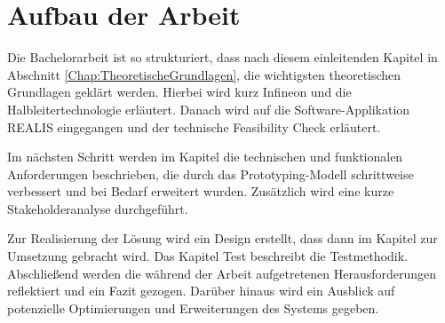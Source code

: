 \section{Aufbau der Arbeit}
Die Bachelorarbeit ist so strukturiert, dass nach diesem einleitenden Kapitel in Abschnitt \ref{Chap:TheoretischeGrundlagen}, die wichtigsten theoretischen Grundlagen geklärt werden. 
Hierbei wird kurz Infineon und die Halbleitertechnologie erläutert. Danach wird auf die Software-Applikation \gls{REALIS} eingegangen und der technische Feasibility Check erläutert.

Im nächsten Schritt werden im Kapitel  die technischen und funktionalen Anforderungen beschrieben, die durch das Prototyping-Modell schrittweise verbessert und bei Bedarf erweitert wurden. Zusätzlich wird eine kurze Stakeholderanalyse durchgeführt.

Zur Realisierung der Lösung wird ein Design erstellt, dass dann im Kapitel  zur Umsetzung gebracht wird. Das Kapitel Test beschreibt die Testmethodik. Abschließend werden die während der Arbeit aufgetretenen Herausforderungen reflektiert und ein Fazit gezogen. Darüber hinaus wird ein Ausblick auf potenzielle Optimierungen und Erweiterungen des Systems gegeben.